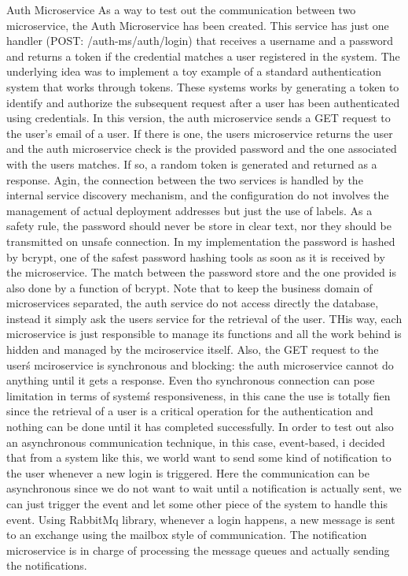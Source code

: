 \documentclass[sigplan,screen]{acmart}
\begin{document}
Auth Microservice
As a way to test out the communication between two microservice, the Auth Microservice has been created. This service has just one handler (POST: /auth-ms/auth/login) that receives a username and a password and returns a token if the credential matches a user registered in the system. The underlying idea was to implement a toy example of a standard authentication system that works through tokens. These systems works by generating a token to identify and authorize the subsequent request after a user has been authenticated using credentials. In this version, the auth microservice sends a GET request to the user's email of a user. If there is one, the users microservice returns the user and the auth microservice check is the provided password and the one associated with the users matches. If so, a random token is generated and returned as a response. Agin, the connection between the two services is handled by the internal service discovery mechanism, and the configuration do not involves the management of actual deployment addresses but just the use of labels. As a safety rule, the password should never be store in clear text, nor they should be transmitted on unsafe connection. In my implementation the password is hashed by bcrypt, one of the safest password hashing tools as soon as it is received by the microservice. The match between the password store and the one provided is also done by a function of bcrypt. Note that to keep the business domain of microservices separated, the auth service do not access directly the database, instead it simply ask the users service for the retrieval of the user. THis way, each microservice is just responsible to manage its functions and all the work behind is hidden and managed by the mciroservice itself. Also, the GET request to the userś mciroservice is synchronous and blocking: the auth microservice cannot do anything until it gets a response. Even tho synchronous connection can pose limitation in terms of systemś responsiveness, in this cane the use is totally fien since the retrieval of a user is a critical operation for the authentication and nothing can be done until it has completed successfully. In order to test out also an asynchronous communication technique, in this case, event-based, i decided that from a system like this, we world want to send some kind of notification to the user whenever a new login is triggered. Here the communication can be asynchronous since we do not want to wait until a notification is actually sent, we can just trigger the event and let some other piece of the system to handle this event. Using RabbitMq library, whenever a login happens, a new message is sent to an exchange using the mailbox style of communication. The notification microservice is in charge of processing the message queues and actually sending the notifications.
\end{document}
